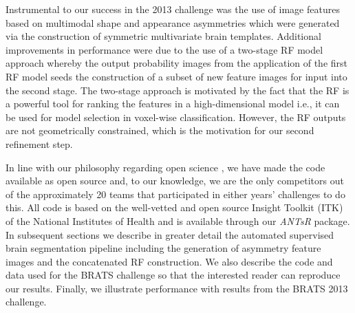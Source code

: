\documentclass[preprint,authoryear,review,12pt]{elsarticle}
\begin{document}


Instrumental to our success in the 2013 challenge 
was the use of image features based on multimodal shape and appearance 
asymmetries which were generated via the construction of symmetric
multivariate brain templates.  Additional improvements in performance
were due to the use of a two-stage RF model approach
whereby the output probability images from the application of the first
RF model seeds the construction of a subset of new feature images
for input into the second stage.  
The two-stage approach is motivated by
the fact that the RF is a powerful tool for ranking the features
in a high-dimensional model i.e., it can be used for model selection
in voxel-wise classification.  However, the RF outputs are not geometrically 
constrained, which is the motivation for our second refinement step.

In line with our philosophy regarding open science \citep{tustison2013,ince2012}, 
we have made the code available as open source
and, to our knowledge, we are the only competitors out of the approximately 20 teams 
that participated in either years' challenges to do this.  All code is based
on the well-vetted and open source Insight Toolkit (ITK)
of the National Institutes of Health and is available through our \textit{ANTsR} 
package.
In subsequent sections we describe in greater detail the automated 
supervised brain segmentation pipeline including the generation of asymmetry
feature images and the concatenated RF construction.  We also
describe the code and data used for the BRATS challenge so that 
the interested reader can reproduce our results.  Finally, we 
illustrate performance with results from the BRATS 2013 challenge.
 
\end{document}

